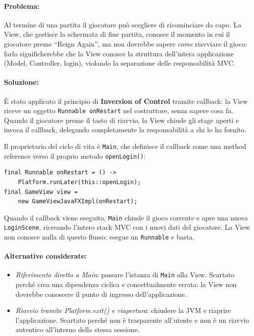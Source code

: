 \documentclass[11pt, a4paper, oneside]{report}
\begin{document}
\paragraph{Problema:}
Al termine di una partita il giocatore può scegliere di ricominciare
da capo. La View, che gestisce la schermata di fine partita, conosce
il momento in cui il giocatore preme ``Reign Again'', ma non dovrebbe
sapere \emph{come} riavviare il gioco: farlo significherebbe che la
View conosce la struttura dell'intera applicazione (Model, Controller,
login), violando la separazione delle responsabilità MVC.

\paragraph{Soluzione:}
È stato applicato il principio di \textbf{Inversion of Control} tramite
callback: la View riceve un oggetto \texttt{Runnable onRestart} nel
costruttore, senza sapere cosa fa. Quando il giocatore preme il tasto
di riavvio, la View chiude gli stage aperti e invoca il callback,
delegando completamente la responsabilità a chi lo ha fornito.

Il proprietario del ciclo di vita è \texttt{Main}, che definisce il
callback come una method reference verso il proprio metodo
\texttt{openLogin()}:

\begin{lstlisting}
final Runnable onRestart = () ->
    Platform.runLater(this::openLogin);
final GameView view =
    new GameViewJavaFXImpl(onRestart);
\end{lstlisting}

Quando il callback viene eseguito, \texttt{Main} chiude il gioco
corrente e apre una nuova \texttt{LoginScene}, ricreando l'intero
stack MVC con i nuovi dati del giocatore. La View non conosce
nulla di questo flusso: esegue un \texttt{Runnable} e basta.

\paragraph{Alternative considerate:}
\begin{itemize}
    \item \emph{Riferimento diretto a Main}: passare l'istanza di
        \texttt{Main} alla View. Scartato perché crea una dipendenza
        ciclica e concettualmente errata: la View non dovrebbe
        conoscere il punto di ingresso dell'applicazione.
    \item \emph{Riavvio tramite Platform.exit() e riapertura}:
        chiudere la JVM e riaprire l'applicazione. Scartato perché
        non è trasparente all'utente e non è un riavvio autentico
        all'interno della stessa sessione.
\end{itemize}
\end{document}
